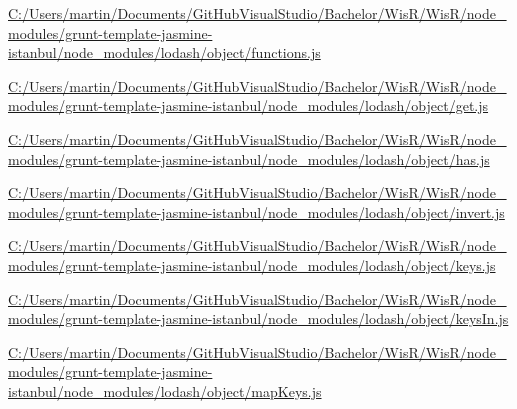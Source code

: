 \begin{DoxyCompactItemize}
\item 
\hyperlink{_c_1_2_users_2martin_2_documents_2_git_hub_visual_studio_2_bachelor_2_wis_r_2_wis_r_2node_module7a4e7acba1f89856c81e2c072e41eb24}{C\+:/\+Users/martin/\+Documents/\+Git\+Hub\+Visual\+Studio/\+Bachelor/\+Wis\+R/\+Wis\+R/node\+\_\+modules/grunt-\/template-\/jasmine-\/istanbul/node\+\_\+modules/lodash/object/functions.\+js}
\item 
\hyperlink{_c_1_2_users_2martin_2_documents_2_git_hub_visual_studio_2_bachelor_2_wis_r_2_wis_r_2node_module41ed309dcf1e6170a580b88d676e2f00}{C\+:/\+Users/martin/\+Documents/\+Git\+Hub\+Visual\+Studio/\+Bachelor/\+Wis\+R/\+Wis\+R/node\+\_\+modules/grunt-\/template-\/jasmine-\/istanbul/node\+\_\+modules/lodash/object/get.\+js}
\item 
\hyperlink{_c_1_2_users_2martin_2_documents_2_git_hub_visual_studio_2_bachelor_2_wis_r_2_wis_r_2node_modulea712a55f8f1df407f18c03cb57735643}{C\+:/\+Users/martin/\+Documents/\+Git\+Hub\+Visual\+Studio/\+Bachelor/\+Wis\+R/\+Wis\+R/node\+\_\+modules/grunt-\/template-\/jasmine-\/istanbul/node\+\_\+modules/lodash/object/has.\+js}
\item 
\hyperlink{_c_1_2_users_2martin_2_documents_2_git_hub_visual_studio_2_bachelor_2_wis_r_2_wis_r_2node_moduleb4793deb825e06c600c1d3dfd71b7dc9}{C\+:/\+Users/martin/\+Documents/\+Git\+Hub\+Visual\+Studio/\+Bachelor/\+Wis\+R/\+Wis\+R/node\+\_\+modules/grunt-\/template-\/jasmine-\/istanbul/node\+\_\+modules/lodash/object/invert.\+js}
\item 
\hyperlink{_c_1_2_users_2martin_2_documents_2_git_hub_visual_studio_2_bachelor_2_wis_r_2_wis_r_2node_module6dbd024f9fd2eba691cde173f91c59bb}{C\+:/\+Users/martin/\+Documents/\+Git\+Hub\+Visual\+Studio/\+Bachelor/\+Wis\+R/\+Wis\+R/node\+\_\+modules/grunt-\/template-\/jasmine-\/istanbul/node\+\_\+modules/lodash/object/keys.\+js}
\item 
\hyperlink{_c_1_2_users_2martin_2_documents_2_git_hub_visual_studio_2_bachelor_2_wis_r_2_wis_r_2node_module891a234ff3a7f38590eac4dfb5ebb9e2}{C\+:/\+Users/martin/\+Documents/\+Git\+Hub\+Visual\+Studio/\+Bachelor/\+Wis\+R/\+Wis\+R/node\+\_\+modules/grunt-\/template-\/jasmine-\/istanbul/node\+\_\+modules/lodash/object/keys\+In.\+js}
\item 
\hyperlink{_c_1_2_users_2martin_2_documents_2_git_hub_visual_studio_2_bachelor_2_wis_r_2_wis_r_2node_moduleb1673319e671d80597bf4ac4fd78a47b}{C\+:/\+Users/martin/\+Documents/\+Git\+Hub\+Visual\+Studio/\+Bachelor/\+Wis\+R/\+Wis\+R/node\+\_\+modules/grunt-\/template-\/jasmine-\/istanbul/node\+\_\+modules/lodash/object/map\+Keys.\+js}

\end{DoxyCompactItemize}
